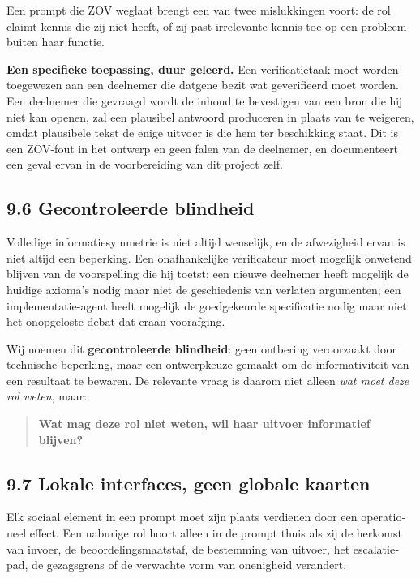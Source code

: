 \begin{dutch}
Een prompt die ZOV weglaat brengt een van twee mislukkingen voort: de rol claimt kennis die zij niet heeft, of zij past irrelevante kennis toe op een probleem buiten haar functie.

\textbf{Een specifieke toepassing, duur geleerd.} Een verificatietaak moet worden toegewezen aan een deelnemer die datgene bezit wat geverifieerd moet worden. Een deelnemer die gevraagd wordt de inhoud te bevestigen van een bron die hij niet kan openen, zal een plausibel antwoord produceren in plaats van te weigeren, omdat plausibele tekst de enige uitvoer is die hem ter beschikking staat. Dit is een ZOV-fout in het ontwerp en geen falen van de deelnemer, en  documenteert een geval ervan in de voorbereiding van dit project zelf.


\subsection*{9.6 Gecontroleerde blindheid}
\label{sec:nl:9.6}

Volledige informatiesymmetrie is niet altijd wenselijk, en de afwezigheid ervan is niet altijd een beperking. Een onafhankelijke verificateur moet mogelijk onwetend blijven van de voorspelling die hij toetst; een nieuwe deelnemer heeft mogelijk de huidige axioma's nodig maar niet de geschiedenis van verlaten argumenten; een implementatie-agent heeft mogelijk de goedgekeurde specificatie nodig maar niet het onopgeloste debat dat eraan voorafging.

Wij noemen dit \textbf{gecontroleerde blindheid}: geen ontbering veroorzaakt door technische beperking, maar een ontwerpkeuze gemaakt om de informativiteit van een resultaat te bewaren. De relevante vraag is daarom niet alleen \emph{wat moet deze rol weten}, maar:

\begin{quote}
\textbf{Wat mag deze rol niet weten, wil haar uitvoer informatief blijven?}
\end{quote}

\subsection*{9.7 Lokale interfaces, geen globale kaarten}
\label{sec:nl:9.7}

Elk sociaal element in een prompt moet zijn plaats verdienen door een operationeel effect. Een naburige rol hoort alleen in de prompt thuis als zij de herkomst van invoer, de beoordelingsmaatstaf, de bestemming van uitvoer, het escalatiepad, de gezagsgrens of de verwachte vorm van onenigheid verandert.


\end{dutch}
